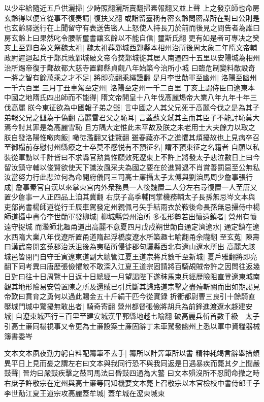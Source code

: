 以少牢給隨近五戶供灑掃|{
	少詩照翻灑所賣翻掃素報翻又並上聲}
上之發京師也命房玄齡得以便宜從事不復奏請|{
	復扶又翻}
或詣留臺稱有密玄齡問密謀所在對曰公則是也玄齡驛送行在上聞留守有表送告密人上怒使人持長刀於前而後見之問告者為誰曰房玄齡上曰果然叱令腰斬璽書讓玄齡以不能自信|{
	璽斯氏翻}
更有如是者可專决之癸亥上至鄴自為文祭魏太袓|{
	魏太袓葬鄴城西鄴縣本相州治所後周太象二年隋文帝輔政尉遲迴起兵于鄴兵敗鄴城破文帝令焚鄴城徙其居人南遷四十五里以安陽城為相州治所焬帝復于鄴故都大慈寺置鄴縣貞觀八年始築今治所小城}
曰臨危制變料敵設奇一將之智有餘萬乘之才不足|{
	將即亮翻乘繩證翻}
是月李世勣軍至幽州|{
	洛陽至幽州一千六百里}
三月丁丑車駕至定州|{
	洛陽至定州一千二百里}
丁亥上謂侍臣曰遼東本中國之地隋氏四出師而不能得|{
	隋文帝開皇十八年伐高麗焬帝大業八年九年十年三伐高麗}
朕今東征欲為中國報子弟之讎|{
	言中國之人其父兄死于高麗今伐之是為其子弟報父兄之讎為于偽翻}
高麗雪君父之恥耳|{
	言蓋蘇文弑其主而其臣子不能討恥莫大焉今討其罪是為高麗雪恥}
且方隅大定惟此未平故及朕之未老用士大夫餘力以取之朕自發洛陽惟噉肉飯|{
	噉徒濫翻又徒覽翻}
雖春蔬亦不之進懼其煩擾故也上見病卒召至御榻前存慰付州縣療之士卒莫不感悦有不預征名|{
	謂不預東征之名籍者}
自願以私裝從軍動以千計皆曰不求縣官勲賞惟願效死遼東上不許上將發太子悲泣數日上曰今留汝鎮守輔以俊賢欲使天下識汝風采夫為國之要在於進賢退不肖賞善罰惡至公無私汝當努力行此悲泣何為命開府儀同三司高士亷攝太子太傅與劉洎馬周少詹事張行成|{
	詹事秦官自漢以來掌東宫内外衆務員一人後魏置二人分左右尋復置一人至唐又置少詹事一人正四品上洎其冀翻}
右庶子高季輔同掌機務輔太子長孫無忌岑文本與吏部尚書楊師道從行壬辰車駕發定州親佩弓矢手結雨衣於鞍後命長孫無忌攝侍中楊師道攝中書令李世勣軍發柳城|{
	柳城縣營州治所}
多張形勢若出懷遠鎮者|{
	營州有懷遠守捉城}
而濳師北趣甬道出高麗不意夏四月戊戍朔世勣自通定濟遼水|{
	通定鎮在遼水西隋大業八年伐遼所置甬道隋起浮橋度遼水所築趣七喻翻甬余隴翻}
至玄菟|{
	陳壽曰漢武帝開玄菟郡治沃沮後為夷貊所侵徙郡句驪縣西北有遼山遼水所出}
高麗大駭城邑皆閉門自守壬寅遼東道副大總管江夏王道宗將兵數千至新城|{
	夏戶雅翻將即亮翻下同考異曰唐歷張儉懼敵不敢深入江夏王道宗固請將百騎覘賊帝許之因問往返幾日對曰往十日周覽十日返十日總經一月望謁陛下遂秣馬束兵經歷險阻直登遼東城南觀其地形險易安營置陳之所及還賊已引兵斷其歸路道宗擊之盡殪斬關而出如期謁見帝歎曰賁育之勇何以過此賜金五十斤絹干匹今從實録}
折衝都尉曹三良引十餘騎直壓城門城中驚擾無敢出者|{
	騎奇寄翻}
營州都督張儉將胡兵為前鋒進渡遼水趍建安城|{
	自遼東城西行三百里至建安城漢平郭縣地趍七喻翻}
破高麗兵斬首數千級　太子引高士亷同榻視事又令更為士亷設案士亷固辭丁未車駕發幽州上悉以軍中資糧器械簿書委岑

文本文本夙夜勤力躬自料配籌筆不去手|{
	籌所以計筭筆所以書}
精神耗竭言辭舉措頗異平日上見而憂之謂左右曰文本與我同行恐不與我同返是日遇暴疾而薨其夕上聞嚴鼓聲|{
	晉灼曰嚴鼓疾擊之鼓司馬法曰昏鼓四通為大鼜}
曰文本殞沒所不忍聞命撤之時右庶子許敬宗在定州與高士亷等同知機要文本薨上召敬宗以本官檢校中書侍郎壬子李世勣江夏王道宗攻高麗蓋牟城|{
	蓋牟城在遼東城東}


